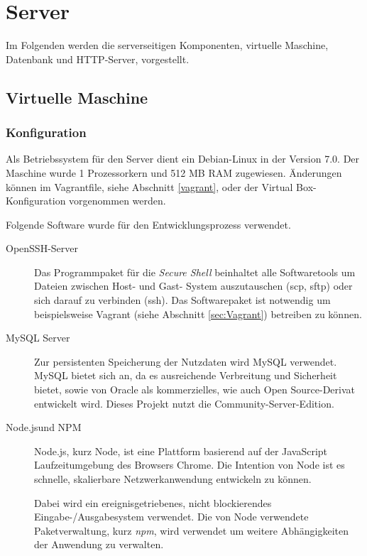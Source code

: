 \section{Server}
\label{server}

Im Folgenden werden die serverseitigen Komponenten, virtuelle Maschine, Datenbank und \ac{HTTP}-Server, vorgestellt. 

\subsection{Virtuelle Maschine}

\subsubsection{Konfiguration \label{sec:vm-config}}

Als Betriebssystem für den Server dient ein Debian-Linux in der Version 7.0. Der Maschine wurde 1 Prozessorkern und 512 MB RAM zugewiesen. Änderungen können im Vagrantfile, siehe Abschnitt \ref{vagrant}, oder der Virtual Box-Konfiguration vorgenommen werden. 

Folgende Software wurde für den Entwicklungsprozess verwendet. 
\begin{description}
	\item[OpenSSH-Server\footnotemark] 
	Das Programmpaket für die \emph{Secure Shell} beinhaltet alle Softwaretools um Dateien zwischen Host- und Gast- System auszutauschen (scp, sftp) oder sich darauf zu verbinden (ssh). 
	Das Softwarepaket ist notwendig um beispielsweise Vagrant (siehe Abschnitt \ref{sec:Vagrant}) betreiben zu können. 

	\item[MySQL Server\footnotemark]
	Zur persistenten Speicherung der Nutzdaten wird MySQL verwendet. MySQL bietet sich an, da es ausreichende Verbreitung und Sicherheit bietet, sowie von Oracle als kommerzielles, wie auch Open Source-Derivat entwickelt wird. Dieses Projekt nutzt die Community-Server-Edition.
	
	\item[Node.js\footnotemark und NPM\footnotemark]
	Node.js, kurz Node, ist eine Plattform basierend auf der JavaScript Laufzeitumgebung des Browsers Chrome. 
	Die Intention von Node ist es schnelle, skalierbare Netzwerkanwendung entwickeln zu können.\cite[vgl.][14\psq]{nodejs_therightway}
	
	Dabei wird ein ereignisgetriebenes, nicht blockierendes Eingabe-/Ausgabesystem verwendet.
	Die von Node verwendete Paketverwaltung, kurz \emph{npm}, wird verwendet um weitere Abhängigkeiten der Anwendung zu verwalten.
	
\end{description}

